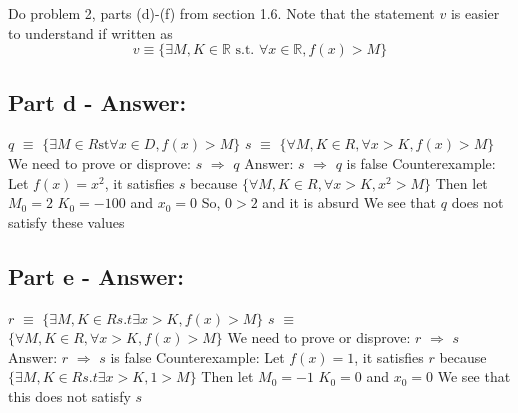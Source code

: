 \documentclass[12pt]{article}
\begin{document}
Do problem 2, parts (d)-(f) from section 1.6. Note that the statement $v$ is easier to understand if written as
\[
v\equiv\{\exists M,K\in\mathbb{R}\text{ s.t. }\forall x\in\mathbb{R}, f(x)>M\}
\]
\subsection*{Part d - Answer:}
{
$q$ $\equiv$ $\{\exists M \in R \text{st} \forall x \in D, f(x)>M\}$\newline
 \newline
$s$ $\equiv$ $\{\forall M,K \in R, \forall x>K,f(x)>M\}$\newline
 \newline
We need to prove or disprove: $s$ $\Rightarrow$ $q$\newline
Answer: $s$ $\Rightarrow$ $q$ is false\newline
Counterexample: Let $f(x)=x^{2}$, it satisfies $s$\newline
because $\{\forall M,K \in R, \forall x>K,x^{2}>M\}$\newline
Then let $M_{0}=2$ $K_{0}=-100$ and $x_{0}=0$\newline
So, $0>2$ and it is absurd\newline
We see that $q$ does not satisfy these values\newline
}
\subsection*{Part e - Answer:}
{
$r$ $\equiv$ $\{\exists M,K \in R s.t \exists x>K, f(x)>M\}$\newline
 \newline
$s$ $\equiv$ $\{\forall M,K \in R, \forall x>K,f(x)>M\}$\newline
 \newline
We need to prove or disprove: $r$ $\Rightarrow$ $s$\newline
Answer: $r$ $\Rightarrow$ $s$ is false\newline
Counterexample: Let $f(x)= 1$, it satisfies $r$\newline
because $\{\exists M,K \in R s.t \exists x>K, 1>M\}$\newline
Then let $M_{0}=-1$ $K_{0}=0$ and $x_{0}=0$\newline
We see that this does not satisfy $s$
}
\end{document}
